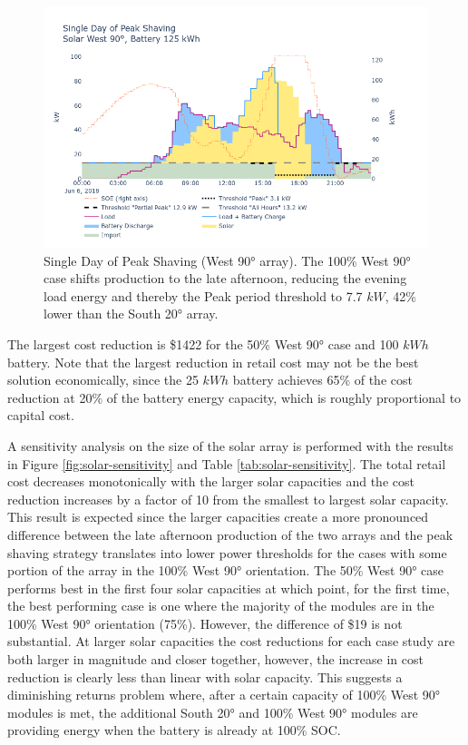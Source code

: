 \documentclass[conference]{IEEEtran}
\begin{document}
\begin{figure}
    \centering
    \includegraphics[width=1\linewidth]{images/single day of peak shaving west.png}
    \caption{Single Day of Peak Shaving (West 90° array). The 100\% West 90° case shifts production to the late afternoon, reducing the evening load energy and thereby the Peak period threshold to 7.7 $kW$, 42\% lower than the South 20° array.}
    \label{fig:peak-shaving-west}
\end{figure}
The largest cost reduction is \$1422 for the 50\% West 90° case and 100 $kWh$ battery. Note that the largest reduction in retail cost may not be the best solution economically, since the 25 $kWh$ battery achieves 65\% of the cost reduction at 20\% of the battery energy capacity, which is roughly proportional to capital cost.

A sensitivity analysis on the size of the solar array is performed with the results in Figure \ref{fig:solar-sensitivity} and Table \ref{tab:solar-sensitivity}. The total retail cost decreases monotonically with the larger solar capacities and the cost reduction increases by a factor of 10 from the smallest to largest solar capacity. This result is expected since the larger capacities create a more pronounced difference between the late afternoon production of the two arrays and the peak shaving strategy translates into lower power thresholds for the cases with some portion of the array in the 100\% West 90° orientation. The 50\% West 90° case performs best in the first four solar capacities at which point, for the first time, the best performing case is one where the majority of the modules are in the 100\% West 90° orientation (75\%). However, the difference of \$19 is not substantial. At larger solar capacities the cost reductions for each case study are both larger in magnitude and closer together, however, the increase in cost reduction is clearly less than linear with solar capacity. This suggests a diminishing returns problem where, after a certain capacity of 100\% West 90° modules is met, the additional South 20° and 100\% West 90° modules are providing energy when the battery is already at 100\% SOC.
\end{document}
